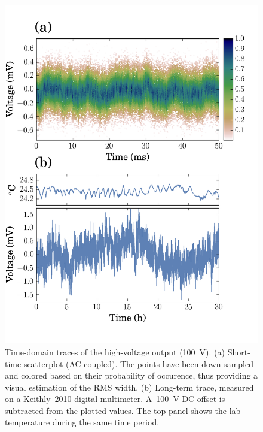 \documentclass[aip,rsi,reprint]{revtex4-1} %
\begin{document}
\begin{figure}[b]
\includegraphics[width=\columnwidth]{fig/TimeDomain.png}
\caption{Time-domain traces of the high-voltage output (\SI{100}{\volt}). (a) Short-time scatterplot  (AC coupled). 
The points have been down-sampled and colored based on their probability of occurence, thus providing a visual estimation of the RMS width.
(b) Long-term trace, measured on a Keithly~2010 digital multimeter. A~\SI{100}{\volt} DC offset is subtracted from the plotted values. The top panel shows the lab temperature during the same time period.\label{Fig:TimeDomain}}
\end{figure}
\end{document}
